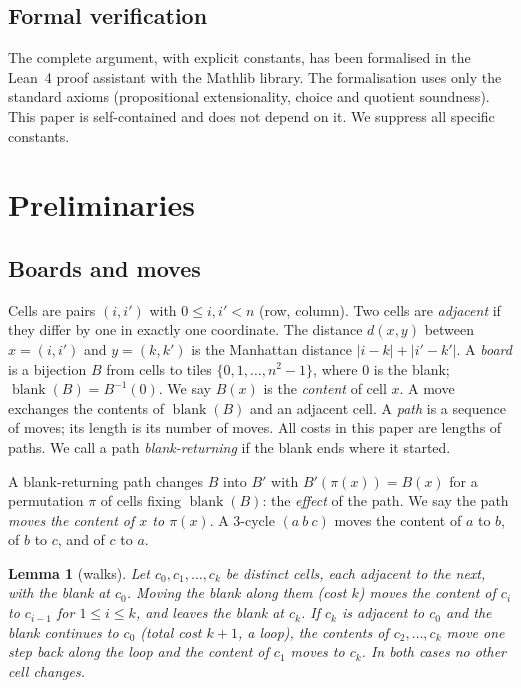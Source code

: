\documentclass[11pt]{amsart}
\newtheorem{lemma}[theorem]{Lemma}
\theoremstyle{definition}
\newcommand{\blank}{\operatorname{blank}}
\begin{document}
\subsection*{Formal verification}
The complete argument, with explicit constants, has been formalised in the Lean~4 proof assistant
with the Mathlib library. The formalisation uses only the standard axioms (propositional
extensionality, choice and quotient soundness). This paper is self-contained and
does not depend on it. We suppress all specific constants.

\section{Preliminaries}\label{sec:prelim}

\subsection{Boards and moves}
Cells are pairs $(i,i')$ with $0\le i,i'<n$ (row, column). Two cells are
\emph{adjacent} if they differ by one in exactly one coordinate. The distance
$d(x,y)$ between $x=(i,i')$ and $y=(k,k')$ is the Manhattan distance $|i-k|+|i'-k'|$. A \emph{board} is a bijection
$B$ from cells to tiles $\{0,1,\dots,n^2-1\}$, where $0$ is the blank;
$\blank(B)=B^{-1}(0)$. We say $B(x)$ is the \emph{content} of cell $x$. A move
exchanges the contents of $\blank(B)$ and an adjacent cell. A \emph{path} is a
sequence of moves; its length is its number of moves. All costs in this paper
are lengths of paths. We call a path \emph{blank-returning} if the blank ends
where it started.

A blank-returning path changes $B$ into $B'$ with $B'(\pi(x))=B(x)$ for a
permutation $\pi$ of cells fixing $\blank(B)$: the \emph{effect} of the path. We say the path
\emph{moves the content of $x$ to $\pi(x)$}. A $3$-cycle $(a\ b\ c)$ moves the content of
$a$ to $b$, of $b$ to $c$, and of $c$ to $a$.

\begin{lemma}[walks]\label{lem:walk}
Let $c_0,c_1,\dots,c_k$ be distinct cells, each adjacent to the next, with the
blank at $c_0$. Moving the blank along them (cost $k$) moves the content of
$c_i$ to $c_{i-1}$ for $1\le i\le k$, and leaves the blank at $c_k$. If $c_k$ is adjacent to
$c_0$ and the blank continues to $c_0$ (total cost $k+1$, a \emph{loop}), the contents of
$c_2,\dots,c_k$ move one step back along the loop and the content of $c_1$ moves to
$c_k$. In both cases no other cell changes.
\end{lemma}
\end{document}
